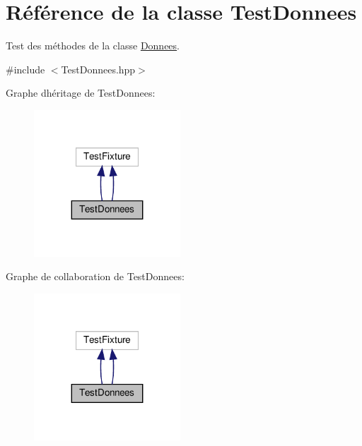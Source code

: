 \hypertarget{classTestDonnees}{}\section{Référence de la classe Test\+Donnees}
\label{classTestDonnees}


Test des méthodes de la classe \hyperlink{classDonnees}{Donnees}.  




{\ttfamily \#include $<$Test\+Donnees.\+hpp$>$}



Graphe d\textquotesingle{}héritage de Test\+Donnees\+:
\nopagebreak
\begin{figure}[H]
\begin{center}
\leavevmode
\includegraphics[width=155pt]{classTestDonnees__inherit__graph}
\end{center}
\end{figure}


Graphe de collaboration de Test\+Donnees\+:
\nopagebreak
\begin{figure}[H]
\begin{center}
\leavevmode
\includegraphics[width=155pt]{classTestDonnees__coll__graph}
\end{center}
\end{figure}
